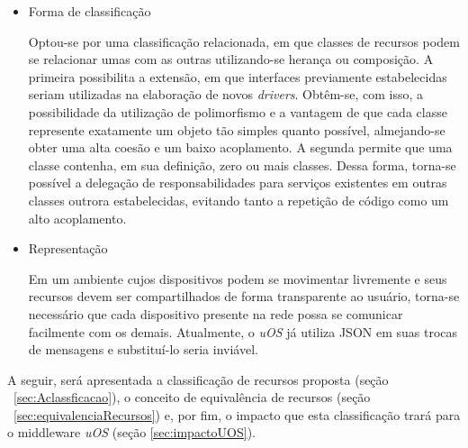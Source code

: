 \begin{itemize}
	\item Forma de classificação

	Optou-se por uma classificação relacionada, em que classes de recursos podem se relacionar umas com as outras utilizando-se herança ou composição. A primeira possibilita a extensão, em que interfaces previamente estabelecidas seriam utilizadas na elaboração de novos \emph{drivers}. Obtêm-se, com isso, a possibilidade da utilização de polimorfismo e a vantagem de que cada classe represente exatamente um objeto tão simples quanto possível, almejando-se obter uma alta coesão e um baixo acoplamento. A segunda permite que uma classe contenha, em sua definição, zero ou mais classes. Dessa forma, torna-se possível a delegação de responsabilidades para serviços existentes em outras classes outrora estabelecidas, evitando tanto a repetição de código como um alto acoplamento.

	\item Representação

	Em um ambiente cujos dispositivos podem se movimentar livremente e seus recursos devem ser compartilhados de forma transparente ao usuário, torna-se necessário que cada dispositivo presente na rede possa se comunicar facilmente com os demais. Atualmente, o \emph{uOS} já utiliza JSON em suas trocas de mensagens e substituí-lo seria inviável.

\end{itemize}

A seguir, será apresentada a classificação de recursos proposta (seção ~\ref{sec:Aclassficacao}), o conceito de equivalência de recursos (seção ~\ref{sec:equivalenciaRecursos}) e, por fim, o impacto que esta classificação trará para o middleware \emph{uOS} (seção \ref{sec:impactoUOS}).


